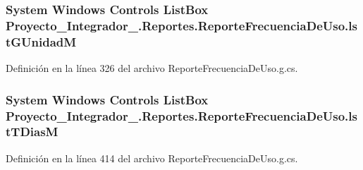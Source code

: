 \hypertarget{class_proyecto___integrador__3_1_1_reportes_1_1_reporte_frecuencia_de_uso_a809e49373e88f304b1f3d5283d757c61}{
\subsubsection[{lst\-G\-Unidad\-M}]{\setlength{\rightskip}{0pt plus 5cm}System Windows Controls List\-Box Proyecto\-\_\-\-Integrador\-\_.\-Reportes.\-Reporte\-Frecuencia\-De\-Uso.\-lst\-G\-Unidad\-M\hspace{0.3cm}{\ttfamily [package]}}}\label{class_proyecto___integrador__3_1_1_reportes_1_1_reporte_frecuencia_de_uso_a809e49373e88f304b1f3d5283d757c61}


Definición en la línea 326 del archivo Reporte\-Frecuencia\-De\-Uso.\-g.\-cs.

\hypertarget{class_proyecto___integrador__3_1_1_reportes_1_1_reporte_frecuencia_de_uso_aef12e55c0fc89f85f601163eda0ffac4}{
\subsubsection[{lst\-T\-Dias\-M}]{\setlength{\rightskip}{0pt plus 5cm}System Windows Controls List\-Box Proyecto\-\_\-\-Integrador\-\_.\-Reportes.\-Reporte\-Frecuencia\-De\-Uso.\-lst\-T\-Dias\-M\hspace{0.3cm}{\ttfamily [package]}}}\label{class_proyecto___integrador__3_1_1_reportes_1_1_reporte_frecuencia_de_uso_aef12e55c0fc89f85f601163eda0ffac4}


Definición en la línea 414 del archivo Reporte\-Frecuencia\-De\-Uso.\-g.\-cs.

